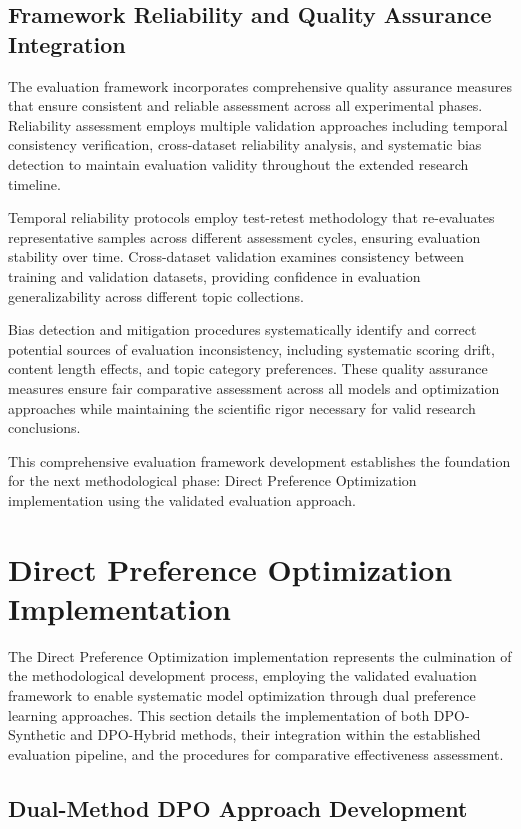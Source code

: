 \subsection{Framework Reliability and Quality Assurance Integration}

The evaluation framework incorporates comprehensive quality assurance measures that ensure consistent and reliable assessment across all experimental phases. Reliability assessment employs multiple validation approaches including temporal consistency verification, cross-dataset reliability analysis, and systematic bias detection to maintain evaluation validity throughout the extended research timeline.

Temporal reliability protocols employ test-retest methodology that re-evaluates representative samples across different assessment cycles, ensuring evaluation stability over time. Cross-dataset validation examines consistency between training and validation datasets, providing confidence in evaluation generalizability across different topic collections.

Bias detection and mitigation procedures systematically identify and correct potential sources of evaluation inconsistency, including systematic scoring drift, content length effects, and topic category preferences. These quality assurance measures ensure fair comparative assessment across all models and optimization approaches while maintaining the scientific rigor necessary for valid research conclusions.

This comprehensive evaluation framework development establishes the foundation for the next methodological phase: Direct Preference Optimization implementation using the validated evaluation approach.

\section{Direct Preference Optimization Implementation}
\label{sec:dpo-implementation}

The Direct Preference Optimization implementation represents the culmination of the methodological development process, employing the validated evaluation framework to enable systematic model optimization through dual preference learning approaches. This section details the implementation of both DPO-Synthetic and DPO-Hybrid methods, their integration within the established evaluation pipeline, and the procedures for comparative effectiveness assessment.

\subsection{Dual-Method DPO Approach Development}

